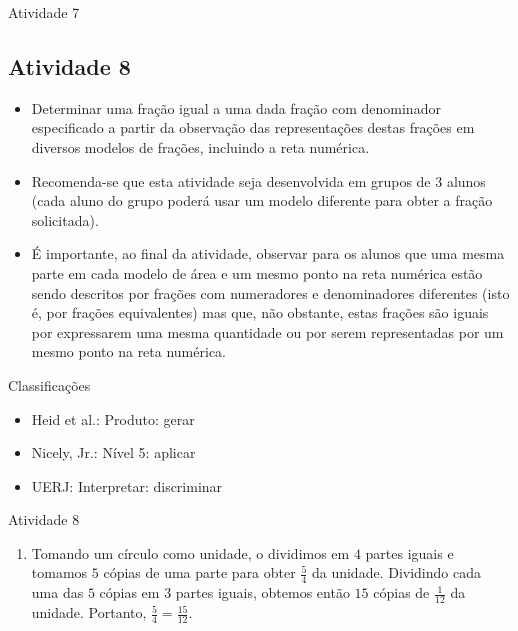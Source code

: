\documentclass[oneside]{book}
\begin{document}
\begin{multicols}{2}
\begin{resposta*}{Atividade 7}
  
\end{resposta*}


\subsection{Atividade 8}

\begin{itemize} %
    \item       Determinar uma fração igual a uma dada fração com denominador 
especificado a partir da observação das representações destas frações em 
diversos modelos de frações, incluindo a reta numérica.
\end{itemize} %
  
 
\begin{itemize} %
    \item       Recomenda-se que esta atividade seja desenvolvida em grupos de 3 
alunos (cada aluno do grupo poderá usar um modelo diferente para obter a fração 
solicitada).
    \item       É importante, ao final da atividade, observar para os alunos que 
uma mesma parte em cada modelo de área e um mesmo ponto na reta numérica estão 
sendo descritos por frações com numeradores e denominadores diferentes (isto é, 
por frações equivalentes) mas que, não obstante, estas frações são iguais por 
expressarem uma mesma quantidade ou por serem representadas por um mesmo ponto 
na reta numérica. 
\end{itemize} %
  
  Classificações  
\begin{itemize} %
    \item       Heid et al.: Produto: gerar
    \item       Nicely, Jr.: Nível 5: aplicar
    \item       UERJ: Interpretar: discriminar
\end{itemize} %

\begin{resposta*}{Atividade 8}  
\begin{enumerate} [\quad a)] %
    \item       Tomando um círculo como unidade, o dividimos em       $4$       
partes iguais e tomamos       $5$       cópias de uma parte para obter       
$\frac{5}{4}$       da unidade. Dividindo cada uma das       $5$       cópias em 
      $3$       partes iguais, obtemos então       $15$       cópias de       
$\frac{1}{12}$       da unidade. Portanto,       $\frac{5}{4} = \frac{15}{12}$.  
     

\end{enumerate}
\end{resposta*}
\end{multicols}
\end{document}
